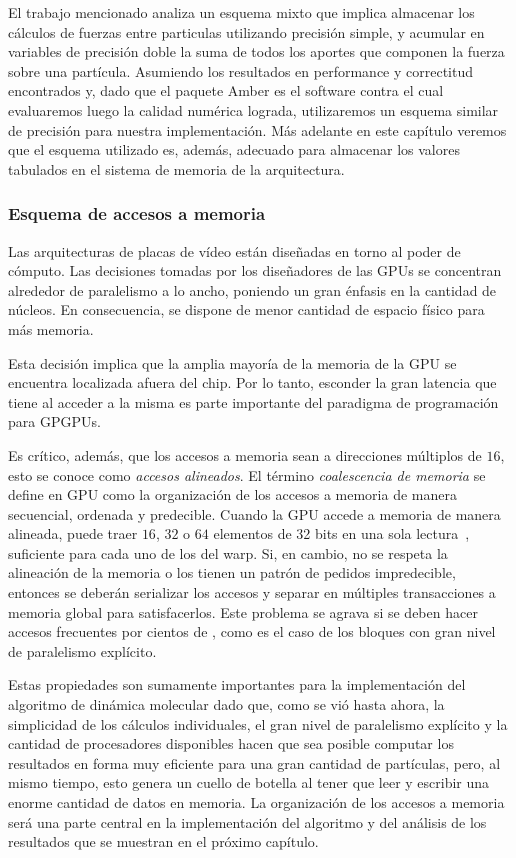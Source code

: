 El trabajo mencionado analiza un esquema mixto que implica almacenar los cálculos de fuerzas entre particulas utilizando precisión simple, y acumular en variables de precisión doble
la suma de todos los aportes que componen la fuerza sobre una partícula. Asumiendo los resultados en performance y correctitud encontrados y,
dado que el paquete Amber es el software contra el cual evaluaremos luego la calidad numérica lograda, utilizaremos un esquema similar de precisión para nuestra implementación.
Más adelante en este capítulo veremos que el esquema utilizado es, además, adecuado para almacenar los valores tabulados en el sistema de memoria de la arquitectura.

\subsubsection{Esquema de accesos a memoria}

Las arquitecturas de placas de v\'ideo est\'an dise\~nadas en torno al poder de c\'omputo.
Las decisiones tomadas por los dise\~nadores de las GPUs se concentran alrededor de paralelismo a lo ancho, poniendo un gran \'enfasis en la cantidad de n\'ucleos.
En consecuencia, se dispone de menor cantidad de espacio f\'isico para m\'as memoria.

Esta decisi\'on implica que la amplia mayor\'ia de la memoria de la GPU se encuentra localizada afuera del chip.
Por lo tanto, esconder la gran latencia que tiene al acceder a la misma es parte importante del paradigma de programaci\'on para GPGPUs.

Es cr\'itico, adem\'as, que los accesos a memoria sean a direcciones m\'ultiplos de $16$, esto se conoce como \textit{accesos alineados}.
El t\'ermino \emph{coalescencia de memoria} se define en GPU como la organizaci\'on de los accesos a memoria de manera secuencial, ordenada y predecible.
Cuando la GPU accede a memoria de manera alineada, puede traer $16$, $32$ o $64$ elementos de 32 bits en una sola lectura~\cite{cudaProgrammingGuide}, suficiente para cada uno de los \threads{} del warp.
Si, en cambio, no se respeta la alineaci\'on de la memoria o los \threads{} tienen un patr\'on de pedidos impredecible, entonces se deber\'an serializar los accesos y separar en m\'ultiples transacciones a memoria global para satisfacerlos.
Este problema se agrava si se deben hacer accesos frecuentes por cientos de \threads{}, como es el caso de los bloques con gran nivel de paralelismo expl\'icito.

Estas propiedades son sumamente importantes para la implementación del algoritmo de dinámica molecular dado que, como se vió hasta ahora, la simplicidad de los cálculos individuales, el gran nivel de paralelismo explícito y 
la cantidad de procesadores disponibles hacen que sea posible computar los resultados en forma muy eficiente para una gran cantidad de partículas, pero, al mismo tiempo, esto genera un cuello de botella al tener que leer y 
escribir una enorme cantidad de datos en memoria. La organización de los accesos a memoria será una parte central en la implementación del algoritmo y del análisis de los resultados que se muestran en el próximo capítulo.

